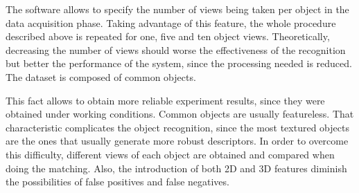 		The software allows to specify the number of views being taken per object in the data acquisition phase. 
		Taking advantage of this feature, the whole procedure described above is repeated for one, five and ten object views.
		Theoretically, decreasing the number of views should worse the effectiveness of the recognition but better the performance of the system, since the processing needed is reduced.
		\\%

		The dataset is composed of common objects. 

		This fact allows to obtain more reliable experiment results, since they were obtained under working conditions. 
		Common objects are usually featureless. 
		That characteristic complicates the object recognition, since the most textured objects are the ones that usually generate more robust descriptors. 
		In order to overcome this difficulty, different views of each object are obtained and compared when doing the matching. 
		Also, the introduction of both 2D and 3D features diminish the possibilities of false positives and false negatives. 
		\\%




